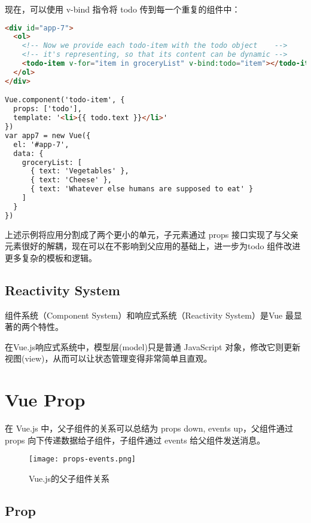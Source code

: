 现在，可以使用 v-bind 指令将 todo 传到每一个重复的组件中：



\begin{lstlisting}[language=HTML]
<div id="app-7">
  <ol>
    <!-- Now we provide each todo-item with the todo object    -->
    <!-- it's representing, so that its content can be dynamic -->
    <todo-item v-for="item in groceryList" v-bind:todo="item"></todo-item>
  </ol>
</div>

Vue.component('todo-item', {
  props: ['todo'],
  template: '<li>{{ todo.text }}</li>'
})
var app7 = new Vue({
  el: '#app-7',
  data: {
    groceryList: [
      { text: 'Vegetables' },
      { text: 'Cheese' },
      { text: 'Whatever else humans are supposed to eat' }
    ]
  }
})
\end{lstlisting}


上述示例将应用分割成了两个更小的单元，子元素通过 props 接口实现了与父亲元素很好的解耦，现在可以在不影响到父应用的基础上，进一步为todo 组件改进更多复杂的模板和逻辑。


\section{Reactivity System}

组件系统（Component System）和响应式系统（Reactivity System）是Vue 最显著的两个特性。

在Vue.js响应式系统中，模型层(model)只是普通 JavaScript 对象，修改它则更新视图(view)，从而可以让状态管理变得非常简单且直观。



\chapter{Vue Prop}


在 Vue.js 中，父子组件的关系可以总结为 props down, events up，父组件通过 props 向下传递数据给子组件，子组件通过 events 给父组件发送消息。

\begin{figure}[htbp]
\centering
\texttt{[image: props-events.png]}
\caption{Vue.js的父子组件关系}
\end{figure}



\section{Prop}



